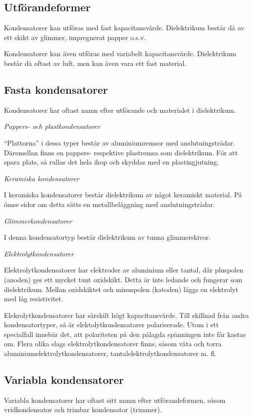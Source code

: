 \subsection{Utförandeformer}

Kondensatorer kan utföras med fast kapacitansvärde. Dielektrikum består då av
ett skikt av glimmer, impregnerat papper o.s.v.

Kondensatorer kan även utföras med variabelt kapacitansvärde. Dielektrikum
består då oftast av luft, men kan även vara ett fast material.

\subsection{Fasta kondensatorer}

Kondensatorer har oftast namn efter utförande och materialet i dielektrikum.

\emph{Pappers- och plastkondensatorer}

``Plattorna'' i dessa typer består av aluminiumremsor med anslutningstrådar.
Däremellan finns en pappers- respektive plastremsa som dielektrikum. För att
spara plats, så rullas det hela ihop och skyddas med en plastingjutning.

\emph{Keramiska kondensatorer}

I keramiska kondensatorer består dielektrikum av något keramiskt material. På
ömse sidor om detta sätts en metallbeläggning med anslutningstrådar.

\emph{Glimmerkondensatorer}

I denna kondensatortyp består dielektrikum av tunna glimmerskivor.

\emph{Elektrolytkondensatorer}

Elektrolytkondensatorer har elektroder av aluminium eller tantal, där pluspolen
(anoden) ges ett mycket tunt oxidskikt. Detta är inte ledande och fungerar som
dielektrikum. Mellan oxidskiktet och minuspolen (katoden) läggs en elektrolyt
med låg resistivitet.

Elekrolytkondensatorer har särskilt högt kapacitansvärde. Till skillnad från
andra kondensatortyper, så är elektolytkondensatorer polariserade. Utom i ett
specialfall innebär det, att polariteten på den pålagda spänningen inte får
kastas om. Flera olika slags elektrolytkondensatorer finns, såsom våta
och torra aluminiumelektrolytkondensatorer, tantalelektrolytkondensatorer m. fl.

\subsection{Variabla kondensatorer}
Variabla kondensatorer har oftast sitt namn efter utförandeformen, såsom
vridkondensator och trimbar kondensator (trimmer).


